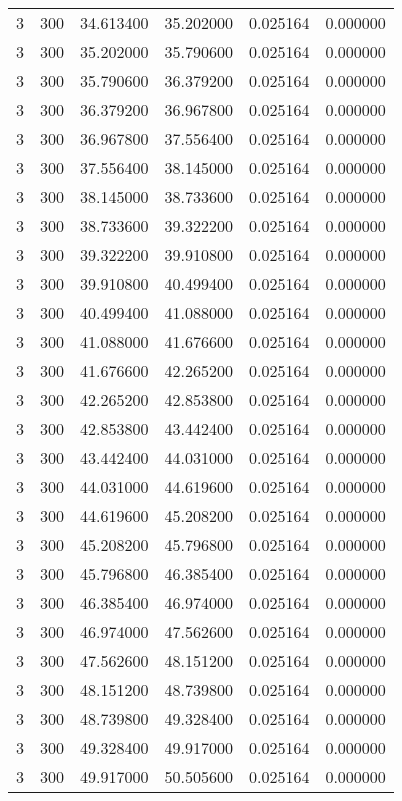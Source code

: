 \begin{longtable}{rrrrrr}
3 & 300 & 34.613400 & 35.202000 & 0.025164 & 0.000000 \\
3 & 300 & 35.202000 & 35.790600 & 0.025164 & 0.000000 \\
3 & 300 & 35.790600 & 36.379200 & 0.025164 & 0.000000 \\
3 & 300 & 36.379200 & 36.967800 & 0.025164 & 0.000000 \\
3 & 300 & 36.967800 & 37.556400 & 0.025164 & 0.000000 \\
3 & 300 & 37.556400 & 38.145000 & 0.025164 & 0.000000 \\
3 & 300 & 38.145000 & 38.733600 & 0.025164 & 0.000000 \\
3 & 300 & 38.733600 & 39.322200 & 0.025164 & 0.000000 \\
3 & 300 & 39.322200 & 39.910800 & 0.025164 & 0.000000 \\
3 & 300 & 39.910800 & 40.499400 & 0.025164 & 0.000000 \\
3 & 300 & 40.499400 & 41.088000 & 0.025164 & 0.000000 \\
3 & 300 & 41.088000 & 41.676600 & 0.025164 & 0.000000 \\
3 & 300 & 41.676600 & 42.265200 & 0.025164 & 0.000000 \\
3 & 300 & 42.265200 & 42.853800 & 0.025164 & 0.000000 \\
3 & 300 & 42.853800 & 43.442400 & 0.025164 & 0.000000 \\
3 & 300 & 43.442400 & 44.031000 & 0.025164 & 0.000000 \\
3 & 300 & 44.031000 & 44.619600 & 0.025164 & 0.000000 \\
3 & 300 & 44.619600 & 45.208200 & 0.025164 & 0.000000 \\
3 & 300 & 45.208200 & 45.796800 & 0.025164 & 0.000000 \\
3 & 300 & 45.796800 & 46.385400 & 0.025164 & 0.000000 \\
3 & 300 & 46.385400 & 46.974000 & 0.025164 & 0.000000 \\
3 & 300 & 46.974000 & 47.562600 & 0.025164 & 0.000000 \\
3 & 300 & 47.562600 & 48.151200 & 0.025164 & 0.000000 \\
3 & 300 & 48.151200 & 48.739800 & 0.025164 & 0.000000 \\
3 & 300 & 48.739800 & 49.328400 & 0.025164 & 0.000000 \\
3 & 300 & 49.328400 & 49.917000 & 0.025164 & 0.000000 \\
3 & 300 & 49.917000 & 50.505600 & 0.025164 & 0.000000 \\

\end{longtable}
